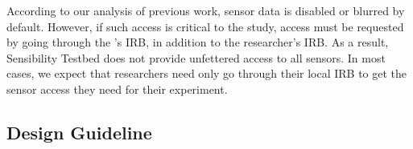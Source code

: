 According to our analysis of previous work, sensor data is disabled or 
blurred by default. However, if such access is critical to the study, access 
must be requested by going through the \sysname's IRB, in addition to the 
researcher's IRB. 
%
%
%
As a result, Sensibility Testbed does not
provide unfettered access to all sensors. 
In most cases, we expect
that researchers need only go through their local IRB to get
the sensor access they need for their experiment. 


\subsection{Design Guideline}\label{sec-principles}

